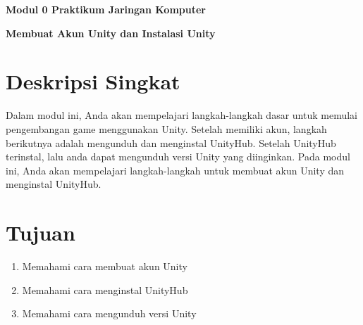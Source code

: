 \documentclass{article}
\begin{document}
    \begin{center}
        \textbf{Modul 0 Praktikum Jaringan Komputer}

        \textbf{Membuat Akun Unity dan Instalasi Unity}
    \end{center}

    \section*{Deskripsi Singkat}
    Dalam modul ini, Anda akan mempelajari langkah-langkah dasar untuk memulai pengembangan game menggunakan Unity. Setelah memiliki akun, langkah berikutnya adalah mengunduh dan menginstal UnityHub. Setelah UnityHub terinstal, lalu anda dapat mengunduh versi Unity yang diinginkan. Pada modul ini, Anda akan mempelajari langkah-langkah untuk membuat akun Unity dan menginstal UnityHub.

    \section*{Tujuan}
    \begin{enumerate}
        \item Memahami cara membuat akun Unity
        \item Memahami cara menginstal UnityHub
        \item Memahami cara mengunduh versi Unity
    \end{enumerate}
\end{document}
